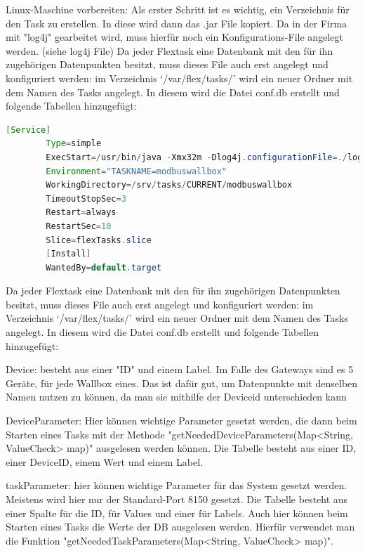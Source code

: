 \begin{compactenum}
    \item Linux-Maschine vorbereiten: Als erster Schritt ist es wichtig, ein Verzeichnis für den Task zu erstellen. In diese wird dann das .jar File kopiert. Da in der Firma mit "log4j" gearbeitet wird, muss hierfür noch ein Konfigurations-File angelegt werden. (siehe log4j File)  
   Da jeder Flextask eine Datenbank mit den für ihn zugehörigen Datenpunkten besitzt, muss dieses File auch erst angelegt und konfiguriert werden: im Verzeichnis ‘/var/flex/tasks/’ wird ein neuer Ordner mit dem Namen des Tasks angelegt. In diesem wird die Datei conf.db erstellt und folgende Tabellen hinzugefügt: 
    \begin{lstlisting}[language=java,caption=Example Element,label=lst:impl:foo]
        [Service]
        Type=simple
        ExecStart=/usr/bin/java -Xmx32m -Dlog4j.configurationFile=./log4j2.xml -jar /srv/tasks/CURRENT/modbuswallbox/modbuswallbox.jar
        Environment="TASKNAME=modbuswallbox"
        WorkingDirectory=/srv/tasks/CURRENT/modbuswallbox
        TimeoutStopSec=3
        Restart=always
        RestartSec=10
        Slice=flexTasks.slice
        [Install]
        WantedBy=default.target
    \end{lstlisting}
    \item Da jeder Flextask eine Datenbank mit den für ihn zugehörigen Datenpunkten besitzt, muss dieses File auch erst angelegt und konfiguriert werden: im Verzeichnis ‘/var/flex/tasks/’ wird ein neuer Ordner mit dem Namen des Tasks angelegt. In diesem wird die Datei conf.db erstellt und folgende Tabellen hinzugefügt: 
    \begin{compactenum}
        \item Device: besteht aus einer "ID" und einem Label. Im Falle des Gateways sind es 5 Geräte, für jede Wallbox eines. Das ist dafür gut, um Datenpunkte mit denselben Namen nutzen zu können, da man sie mithilfe der Deviceid unterschieden kann  
        \item DeviceParameter: Hier können wichtige Parameter gesetzt werden, die dann beim Starten eines Tasks mit der Methode "getNeededDeviceParameters(Map<String, ValueCheck> map)" ausgelesen werden können. Die Tabelle besteht aus einer ID, einer DeviceID, einem Wert und einem Label.  
        \item taskParameter: hier können wichtige Parameter für das System gesetzt werden. Meistens wird hier nur der Standard-Port 8150 gesetzt. Die Tabelle besteht aus einer Spalte für die ID, für Values und einer für Labels. Auch hier können beim Starten eines Tasks die Werte der DB ausgelesen werden. Hierfür verwendet man die Funktion "getNeededTaskParameters(Map<String, ValueCheck> map)".  

\end{compactenum}
\end{compactenum}
